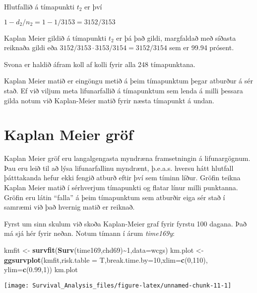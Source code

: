 \documentclass[
]{book}
\newenvironment{Shaded}{\begin{snugshade}}{\end{snugshade}}
\newcommand{\DataTypeTok}[1]{\textcolor[rgb]{0.13,0.29,0.53}{#1}}
\newcommand{\DecValTok}[1]{\textcolor[rgb]{0.00,0.00,0.81}{#1}}
\newcommand{\FloatTok}[1]{\textcolor[rgb]{0.00,0.00,0.81}{#1}}
\newcommand{\KeywordTok}[1]{\textcolor[rgb]{0.13,0.29,0.53}{\textbf{#1}}}
\newcommand{\NormalTok}[1]{#1}
\newcommand{\OperatorTok}[1]{\textcolor[rgb]{0.81,0.36,0.00}{\textbf{#1}}}
\newcommand{\StringTok}[1]{\textcolor[rgb]{0.31,0.60,0.02}{#1}}
\begin{document}
Hlutfallið á tímapunkti \(t_2\) er því

\(1 - d_2/n_2 = 1 - 1/3153 = 3152/3153\)

Kaplan Meier gildið á tímapunkti \(t_2\) er þá það gildi, margfaldað með síðasta reiknaða gildi eða \(3152/3153 \cdot 3153/3154 = 3152/3154\) sem er 99.94 prósent.

Svona er haldið áfram koll af kolli fyrir alla 248 tímapunktana.

Kaplan Meier matið er eingöngu metið á þeim tímapunktum þegar atburður á sér stað. Ef við viljum meta lifunarfallið á tímapunktum sem lenda á milli þessara gilda notum við Kaplan-Meier matið fyrir næsta tímapunkt á undan.

\hypertarget{kaplan-meier-gruxf6f}{%
\section{Kaplan Meier gröf}\label{kaplan-meier-gruxf6f}}

Kaplan Meier gröf eru langalgengasta myndræna framsetningin á lifunargögnum. Þau eru leið til að lýsa lifunarfallinu myndrænt, þ.e.a.s. hversu hátt hlutfall þátttakanda hefur ekki fengið atburð eftir því sem tíminn líður. Gröfin teikna Kaplan Meier matið í sérhverjum tímapunkti og flatar línur milli punktanna. Gröfin eru látin ``falla'' á þeim tímapunktum sem atburðir eiga sér stað í samræmi við það hvernig matið er reiknað.

Fyrst um sinn skulum við skoða Kaplan-Meier graf fyrir fyrstu 100 dagana. Það má sjá hér fyrir neðan. Notum tímann í árum \emph{time169y}:

\begin{Shaded}
\begin{Highlighting}[]
\NormalTok{kmfit <{-}}\StringTok{ }\KeywordTok{survfit}\NormalTok{(}\KeywordTok{Surv}\NormalTok{(time169,chd69)}\OperatorTok{\textasciitilde{}}\DecValTok{1}\NormalTok{,}\DataTypeTok{data=}\NormalTok{wcgs)}
\NormalTok{km.plot <{-}}\StringTok{ }\KeywordTok{ggsurvplot}\NormalTok{(kmfit,}\DataTypeTok{risk.table =}\NormalTok{ T,}\DataTypeTok{break.time.by=}\DecValTok{10}\NormalTok{,}\DataTypeTok{xlim=}\KeywordTok{c}\NormalTok{(}\DecValTok{0}\NormalTok{,}\DecValTok{110}\NormalTok{),}
                      \DataTypeTok{ylim=}\KeywordTok{c}\NormalTok{(}\FloatTok{0.99}\NormalTok{,}\DecValTok{1}\NormalTok{)) }
\NormalTok{km.plot }
\end{Highlighting}
\end{Shaded}

\texttt{[image: Survival\_Analysis\_files/figure-latex/unnamed-chunk-11-1]}
\end{document}

